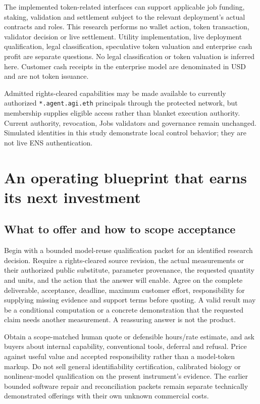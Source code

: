 \documentclass[11pt,letterpaper]{article}
\begin{document}
The implemented token-related interfaces can support applicable job funding, staking, validation and settlement subject to the relevant deployment's actual contracts and roles. This research performs no wallet action, token transaction, validator decision or live settlement. Utility implementation, live deployment qualification, legal classification, speculative token valuation and enterprise cash profit are separate questions. No legal classification or token valuation is inferred here. Customer cash receipts in the enterprise model are denominated in USD and are not token issuance.

Admitted rights-cleared capabilities may be made available to currently authorized \texttt{*.agent.agi.eth} principals through the protected network, but membership supplies eligible access rather than blanket execution authority. Current authority, revocation, Jobs validators and governance remain unchanged. Simulated identities in this study demonstrate local control behavior; they are not live ENS authentication.

\section{An operating blueprint that earns its next investment}
\subsection{What to offer and how to scope acceptance}
Begin with a bounded model-reuse qualification packet for an identified research decision. Require a rights-cleared source revision, the actual measurements or their authorized public substitute, parameter provenance, the requested quantity and units, and the action that the answer will enable. Agree on the complete deliverable, acceptance, deadline, maximum customer effort, responsibility for supplying missing evidence and support terms before quoting. A valid result may be a conditional computation or a concrete demonstration that the requested claim needs another measurement. A reassuring answer is not the product.

Obtain a scope-matched human quote or defensible hours/rate estimate, and ask buyers about internal capability, conventional tools, deferral and refusal. Price against useful value and accepted responsibility rather than a model-token markup. Do not sell general identifiability certification, calibrated biology or nonlinear-model qualification on the present instrument's evidence. The earlier bounded software repair and reconciliation packets remain separate technically demonstrated offerings with their own unknown commercial costs.
\end{document}

